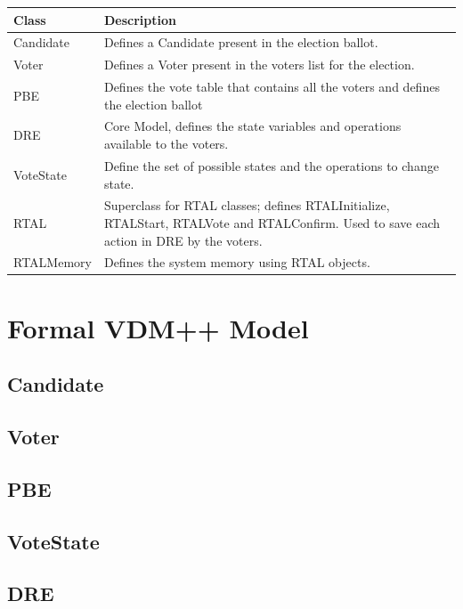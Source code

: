 \documentclass{article}
\begin{document}
\begin{center}
    \begin{tabular}{ | l | p{9.2cm} |}
    \hline
   \textbf{Class}	& \textbf{Description}  \\ \hline
	Candidate & Defines a Candidate present in the election ballot. \\\hline
	Voter & Defines a Voter present in the voters list for the election. \\\hline
	PBE & Defines the vote table that contains all the voters and defines the election ballot \\\hline
	DRE & Core Model, defines the state variables and operations available to the voters.\\\hline
	VoteState &  Define the set of possible states and the operations to change state. \\\hline
	RTAL & Superclass for RTAL classes; defines RTALInitialize, RTALStart, RTALVote and RTALConfirm. Used to save each action in DRE by the voters.\\\hline
	RTALMemory & Defines the system memory using RTAL objects.\\\hline 
    \end{tabular}
\end{center}

\section{Formal VDM++ Model}\label{xpto}
\subsection{Candidate}

\subsection{Voter}

\subsection{PBE}

\subsection{VoteState}

\subsection{DRE}

\end{document}

